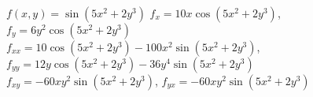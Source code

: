{$f(x,y) = \sin(5x^2+2y^3)$
}
{$f_x=10x\cos(5x^2+2y^3)$, $f_y=6y^2\cos(5x^2+2y^3)$\\
$f_{xx}=10\cos(5x^2+2y^3)-100x^2\sin(5x^2+2y^3)$, $f_{yy}=12y\cos(5x^2+2y^3)-36y^4\sin(5x^2+2y^3)$\\
$f_{xy}=-60xy^2\sin(5x^2+2y^3)$, $f_{yx}=-60xy^2\sin(5x^2+2y^3)$\\
}